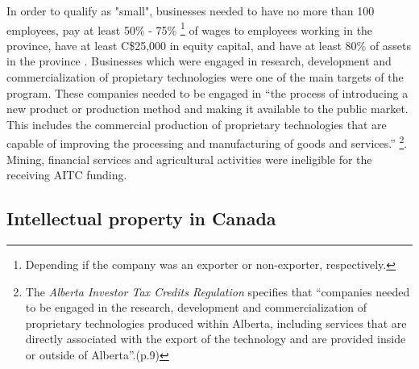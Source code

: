 \documentclass[../main.tex]{subfiles}
\begin{document}
In order to qualify as "small", businesses needed to have no more than 100 employees, pay at least 50\% - 75\% \footnote{Depending if the company was an exporter or non-exporter, respectively.} of wages to employees working in the province, have at least C\$25,000 in equity capital, and have at least 80\% of assets in the province \parencite{albertaeconomicdevelopmentandtrade19}. Businesses which were engaged in research, development and commercialization of propietary technologies were one of the main targets of the program. These companies needed to be engaged in \enquote{the process of introducing a new product or production method and making it available to the public market. This includes the commercial production of proprietary technologies that are capable of improving the processing and manufacturing of goods and services.} \parencite[19]{albertaeconomicdevelopmentandtrade19}\footnote{The \textit{Alberta Investor Tax Credits Regulation}\nocite{Alberta19a} specifies that \enquote{companies needed to be engaged in the research, development and commercialization of proprietary technologies produced within Alberta, including services that are directly associated with the export of the technology and are provided inside or outside of Alberta}.(p.9)}. Mining, financial services and agricultural activities were ineligible for the receiving AITC funding.

\subsection{Intellectual property in Canada}
\end{document}
